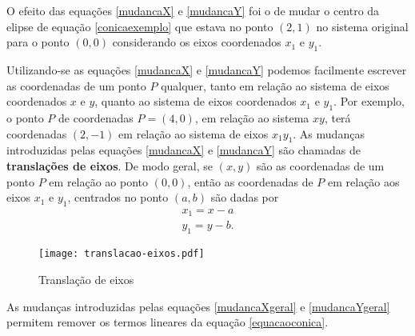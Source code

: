 O efeito das equa\c{c}\~oes \eqref{mudancaX} e \eqref{mudancaY} foi o de mudar o centro da elipse de equa\c{c}\~ao \eqref{conicaexemplo} que estava no ponto $(2,1)$ no sistema original para o ponto $(0,0)$ considerando os eixos coordenados $x_1$ e $y_1$. 

Utilizando-se as equa\c{c}\~oes \eqref{mudancaX} e \eqref{mudancaY} podemos facilmente escrever as coordenadas de um ponto $P$ qualquer, tanto em rela\c{c}\~ao ao sistema de eixos coordenados $x$ e $y$, quanto ao sistema de eixos coordenados $x_1$ e $y_1$. Por exemplo, o ponto $P$ de coordenadas $P = (4,0)$, em rela\c{c}\~ao ao sistema $xy$, ter\'a coordenadas $(2,-1)$ em rela\c{c}\~ao ao sistema de eixos $x_1y_1$. As mudan\c{c}as introduzidas pelas equa\c{c}\~oes \eqref{mudancaX} e \eqref{mudancaY} s\~ao chamadas de \textbf{transla\c{c}\~oes de eixos}. De modo geral, se $(x,y)$ s\~ao as coordenadas de um ponto $P$ em rela\c{c}\~ao ao ponto $(0,0)$, ent\~ao as coordenadas de $P$ em rela\c{c}\~ao aos eixos $x_1$ e $y_1$, centrados no ponto $(a,b)$ s\~ao dadas por
\begin{align}
  x_1 = x - a\label{mudancaXgeral}\\
  y_1 = y - b\label{mudancaYgeral}.
\end{align}

\begin{figure}[!h]
  \centering
  \caption{Transla\c{c}\~ao de eixos}
  \texttt{[image: translacao-eixos.pdf]}
\end{figure}
As mudan\c{c}as introduzidas pelas equa\c{c}\~oes \eqref{mudancaXgeral} e \eqref{mudancaYgeral} permitem remover os termos lineares da equa\c{c}\~ao \eqref{equacaoconica}.

